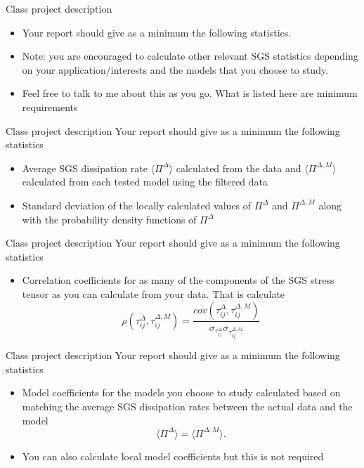 \begin{frame}{Class project description}
\begin{itemize}
	\item Your report should give as a minimum the following statistics. 
	\item Note: you are encouraged to calculate other relevant SGS statistics depending on your application/interests and the models that you choose to study.
	\item Feel free to talk to me about this as you go. What is listed here are minimum requirements
	\end{itemize}
\end{frame}

\begin{frame}{Class project description}
Your report should give as a minimum the following statistics
\begin{itemize}
	\item Average SGS dissipation rate $\langle \Pi^{\Delta}\rangle$ calculated from the data and $\langle \Pi^{\Delta,M} \rangle$ calculated from each tested model using the filtered data
	\item Standard deviation of the locally calculated values of $\Pi^{\Delta}$ and $\Pi^{\Delta,M}$ along with the probability density functions of $\Pi^{\Delta}$
	\end{itemize}
\end{frame}

\begin{frame}{Class project description}
Your report should give as a minimum the following statistics
\begin{itemize}
	\item Correlation coefficients for as many of the components of the SGS stress tensor as you can calculate from your data.  That is calculate 
\begin{equation}
\rho\left( \tau_{ij}^{\Delta},\tau_{ij}^{\Delta,M} \right) =
\frac{cov\left( \tau_{ij}^{\Delta},\tau_{ij}^{\Delta,M} \right)}{\sigma_{\tau_{ij}^{\Delta}} 
\sigma_{\tau_{ij}^{\Delta,M}}} \nonumber
\end{equation}
	\end{itemize}
\end{frame}

\begin{frame}{Class project description}
Your report should give as a minimum the following statistics
\begin{itemize}
	\item Model coefficients for the models you choose to study calculated based on matching the average SGS dissipation rates between the actual data and the model 
\begin{equation}
\langle \Pi^{\Delta} \rangle=\langle \Pi^{\Delta,M} \rangle. \nonumber
\end{equation}
\item You can also calculate local model coefficients but this is not required
	\end{itemize}
\end{frame}

